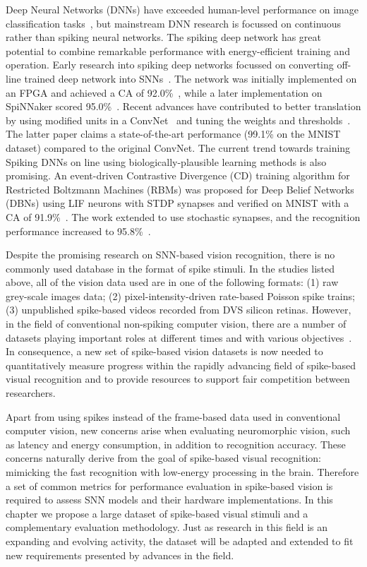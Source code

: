 Deep Neural Networks (DNNs) have exceeded human-level performance on image classification tasks~\citep{he2015delving}, but mainstream DNN research is focussed on continuous rather than spiking neural networks.
The spiking deep network has great potential to combine remarkable performance with energy-efficient training and operation.
Early research into spiking deep networks focussed on converting off-line trained deep network into SNNs~\citep{o2013real}.
The network was initially implemented on an FPGA and achieved a CA of 92.0\%~\citep{neil2014minitaur}, while a later implementation on SpiNNaker scored 95.0\%~\citep{Stromatias2015scalable}.
Recent advances have contributed to better translation by using modified units in a ConvNet~\citep{cao2015spiking} and tuning the weights and thresholds~\citep{diehl2015fast}.
The latter paper claims a state-of-the-art performance (99.1\% on the MNIST dataset) compared to the original ConvNet.
The current trend towards training Spiking DNNs on line using biologically-plausible learning methods is also promising.
An event-driven Contrastive Divergence (CD) training algorithm for Restricted Boltzmann Machines (RBMs) was proposed for Deep Belief Networks (DBNs) using LIF neurons with STDP synapses and verified on MNIST with a CA of 91.9\%~\citep{neftci2013event}.
The work extended to use stochastic synapses, and the recognition performance increased to 95.8\%~\citep{neftci2016stochastic}.


Despite the promising research on SNN-based vision recognition, there is no commonly used database in the format of spike stimuli.
In the studies listed above, all of the vision data used are in one of the following formats:
(1) raw grey-scale images data;
(2) pixel-intensity-driven rate-based Poisson spike trains;
(3) unpublished spike-based videos recorded from DVS silicon retinas.
However, in the field of conventional non-spiking computer vision, there are a number of datasets playing important roles at different times and with various objectives~\citep{lecun1998gradient,deng2009imagenet,blank2005actions,liu2009recognizing}.
In consequence, a new set of spike-based vision datasets is now needed to quantitatively measure progress within the rapidly advancing field of spike-based visual recognition and to provide resources to support fair competition between researchers.

Apart from using spikes instead of the frame-based data used in conventional computer vision, new concerns arise when evaluating neuromorphic vision, such as latency and energy consumption, in addition to recognition accuracy.
These concerns naturally derive from the goal of spike-based visual recognition: mimicking the fast recognition with low-energy processing in the brain. 
Therefore a set of common metrics for performance evaluation in spike-based vision is required to assess SNN models and their hardware implementations.
In this chapter we propose a large dataset of spike-based visual stimuli and a complementary evaluation methodology.
Just as research in this field is an expanding and evolving activity, the dataset will be adapted and extended to fit new requirements presented by advances in the field.






